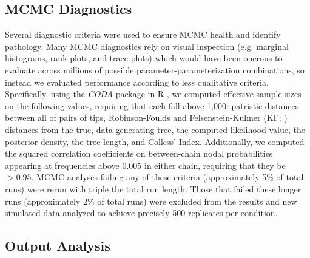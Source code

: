 \documentclass[10pt, twocolumn, twoside]{article}
\begin{document}
\subsection{MCMC Diagnostics}
Several diagnostic criteria were used to ensure MCMC health and identify pathology. Many MCMC diagnostics rely on visual inspection (e.g. marginal histograms, rank plots, and trace plots) which would have been onerous to evaluate across millions of possible parameter-parameterization combinations, so instead we evaluated performance according to less qualitative criteria. Specifically, using the \textit{CODA} package \citep{plummerCODAConvergenceDiagnosis2006} in R \citep{rcoreteamLanguageEnvironmentStatistical2013}, we computed effective sample sizes on the following values, requiring that each fall above 1,000: patristic distances between all of pairs of tips, Robinson-Foulds \citep[RF][]{robinsonComparisonPhylogeneticTrees1981} and Felsenstein-Kuhner (KF; \citeyear{kuhnerSimulationComparisonPhylogeny1994}) distances from the true, data-generating tree, the computed likelihood value, the posterior density, the tree length, and Colless’ Index. Additionally, we computed the squared correlation coefficients on between-chain nodal probabilities appearing at frequencies above 0.005 in either chain, requiring that they be $> 0.95$. MCMC analyses failing any of these criteria (approximately 5\% of total runs) were rerun with triple the total run length. Those that failed these longer runs (approximately 2\% of total runs) were excluded from the results and new simulated data analyzed to achieve precisely 500 replicates per condition.

\subsection{Output Analysis}
\end{document}
